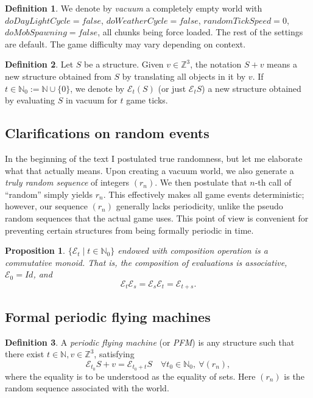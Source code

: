 \documentclass[12pt]{article}
\newcommand{\Z}{\mathbb{Z}}
\newcommand{\N}{\mathbb{N}}
\newcommand{\ev}{\mathcal{E}}
\newtheorem{proposition}{Proposition}
\theoremstyle{remark}
\theoremstyle{definition}
\newtheorem{definition}{Definition}
\begin{document}
\begin{definition}
    We denote by \emph{vacuum} a completely empty world with $doDayLightCycle=false$, $doWeatherCycle=false$, $randomTickSpeed=0$, $doMobSpawning=false$, all chunks being force loaded. The rest of the settings are default. The game difficulty may vary depending on context.
\end{definition}

\begin{definition}
    Let $S$ be a structure. Given $v \in \Z^3$, the notation $S + v$ means a new structure obtained from $S$ by translating all objects in it by $v$.
    If $t \in \N_0:=\N\cup\{0\}$, we denote by $\ev_t(S)$ (or just $\ev_tS$) a new structure obtained by evaluating $S$ in vacuum for $t$ game ticks.
\end{definition}

\subsection{Clarifications on random events}

In the beginning of the text I postulated true randomness, but let me elaborate what that actually means.
Upon creating a vacuum world, we also generate a \emph{truly random sequence} of integers $(r_n)$.
We then postulate that $n$-th call of ``random'' simply yields $r_n$. This effectively makes all game events deterministic; however, our sequence $(r_n)$ generally lacks periodicity, unlike the pseudo random sequences that the actual game uses.
This point of view is convenient for preventing certain structures from being formally periodic in time.

\begin{proposition}
    $\bigl\{\ev_t\mid t\in\N_0\bigr\}$ endowed with composition operation is a commutative monoid.
    That is, the composition of evaluations is associative, $\ev_0=Id$, and
    $$\ev_t\ev_s=\ev_s\ev_t=\ev_{t+s}.$$
\end{proposition}

\subsection{Formal periodic flying machines}

\begin{definition}
    A \emph{periodic flying machine} (or \emph{PFM}) is any structure such that there exist $t \in \N, v \in \Z^3$, satisfying
    $$\ev_{t_0}S + v = \ev_{t_0+t}S \quad \forall t_0\in\N_0,\ \forall (r_n),$$ where the equality is to be understood as the equality of sets. Here $(r_n)$ is the random sequence associated with the world.
\end{definition}
\end{document}
